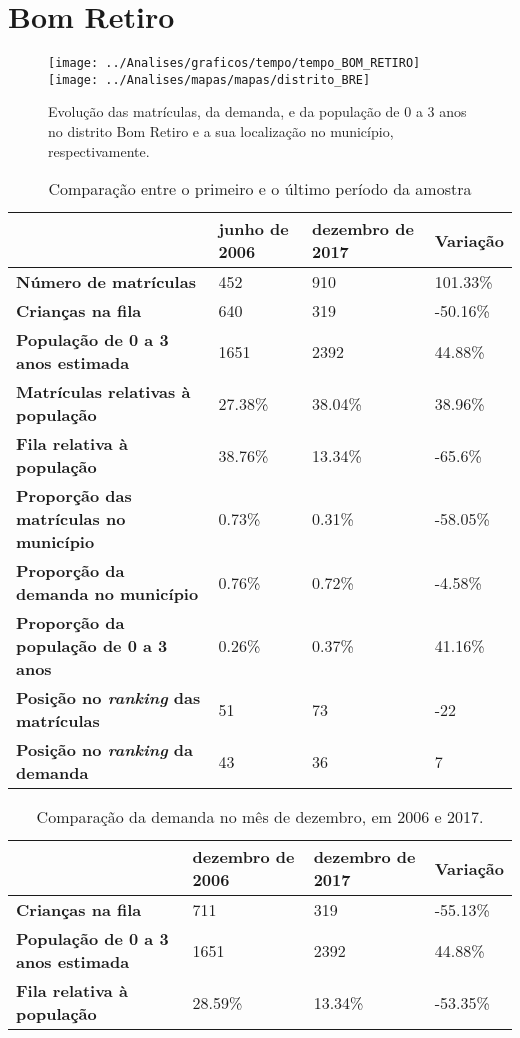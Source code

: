 \section{Bom Retiro}
\begin{figure}[H]
	\centering
	\texttt{[image: ../Analises/graficos/tempo/tempo\_BOM\_RETIRO]}
	\texttt{[image: ../Analises/mapas/mapas/distrito\_BRE]}
	\caption{Evolução das matrículas, da demanda, e da população de 0 a 3 anos no distrito Bom Retiro e a sua localização no município, respectivamente.}
\end{figure}
\begin{table}[H]
	\begin{tabular}{|l|l|l|l|}
		\hline
		\textbf{}                                      & \textbf{junho de 2006}       & \textbf{dezembro de 2017}    & \textbf{Variação} \\ \hline
		\textbf{Número de matrículas}                  & 452 & 910 & 101.33\% \\ \hline
		\textbf{Crianças na fila}                      & 640 & 319 & -50.16\% \\ \hline
		\textbf{População de 0 a 3 anos estimada}      & 1651 & 2392 & 44.88\% \\ \hline
		\textbf{Matrículas relativas à população}      & 27.38\% & 38.04\% & 38.96\% \\ \hline
		\textbf{Fila relativa à população}             & 38.76\% & 13.34\% & -65.6\% \\ \hline
		\textbf{Proporção das matrículas no município} & 0.73\% & 0.31\% & -58.05\% \\ \hline
		\textbf{Proporção da demanda no município}     & 0.76\% & 0.72\% & -4.58\% \\ \hline
		\textbf{Proporção da população de 0 a 3 anos}  & 0.26\% & 0.37\% & 41.16\% \\ \hline
		\textbf{Posição no \textit{ranking} das matrículas}     & 51 & 73 & -22 \\ \hline
		\textbf{Posição no \textit{ranking} da demanda}         & 43 & 36 & 7 \\ \hline
	\end{tabular}
	\caption{Comparação entre o primeiro e o último período da amostra}
\end{table}
\begin{table}[H]
	\begin{tabular}{|l|l|l|l|}
		\hline
		\textbf{}                                 & \textbf{dezembro de 2006} & \textbf{dezembro de 2017} & \textbf{Variação} \\ \hline
		\textbf{Crianças na fila}                      & 711 & 319 & -55.13\% \\ \hline
		\textbf{População de 0 a 3 anos estimada}      & 1651 & 2392 & 44.88\% \\ \hline
		\textbf{Fila relativa à população}             & 28.59\% & 13.34\% & -53.35\% \\ \hline
	\end{tabular}
	\caption{Comparação da demanda no mês de dezembro, em 2006 e 2017.}
\end{table}
